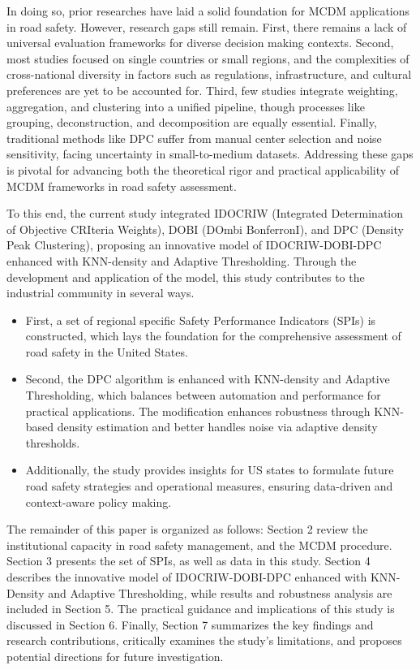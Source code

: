 \documentclass{article}
\begin{document}
In doing so, prior researches have laid a solid foundation for MCDM applications in road safety. However, research gaps still remain. First, there remains a lack of universal evaluation frameworks for diverse decision making contexts. Second, most studies focused on single countries or small regions, and the complexities of cross-national diversity in factors such as regulations, infrastructure, and cultural preferences are yet to be accounted for. Third, few studies integrate weighting, aggregation, and clustering into a unified pipeline, though processes like grouping, deconstruction, and decomposition are equally essential. Finally, traditional methods like DPC suffer from manual center selection and noise sensitivity, facing uncertainty in small-to-medium datasets. Addressing these gaps is pivotal for advancing both the theoretical rigor and practical applicability of MCDM frameworks in road safety assessment.

To this end, the current study integrated IDOCRIW (Integrated Determination of Objective CRIteria Weights), DOBI (DOmbi BonferronI), and DPC (Density Peak Clustering), proposing an innovative model of IDOCRIW-DOBI-DPC enhanced with KNN-density and Adaptive Thresholding. Through the development and application of the model, this study contributes to the industrial community in several ways.
\begin{itemize}
\item First, a set of regional specific Safety Performance Indicators (SPIs) is constructed, which lays the foundation for the comprehensive assessment of road safety in the United States.
\item Second, the DPC algorithm is enhanced with KNN-density and Adaptive Thresholding, which balances between automation and performance for practical applications. The modification enhances robustness through KNN-based density estimation and better handles noise via adaptive density thresholds.
\item Additionally, the study provides insights for US states to formulate future road safety strategies and operational measures, ensuring data-driven and context-aware policy making.
\end{itemize}
The remainder of this paper is organized as follows: Section 2 review the institutional capacity in road safety management, and the MCDM procedure. Section 3 presents the set of SPIs, as well as data in this study. Section 4 describes the innovative model of IDOCRIW-DOBI-DPC enhanced with KNN-Density and Adaptive Thresholding, while results and robustness analysis are included in Section 5. The practical guidance and implications of this study is discussed in Section 6. Finally, Section 7 summarizes the key findings and research contributions, critically examines the study's limitations, and proposes potential directions for future investigation.
\end{document}
